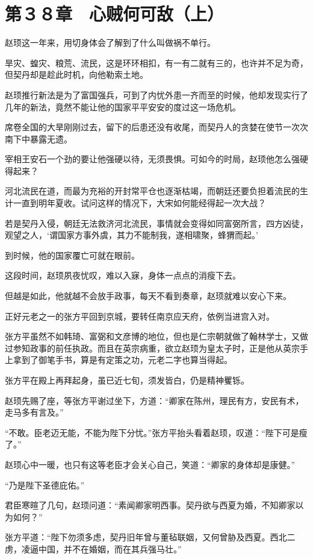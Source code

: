 \section{第３８章　心贼何可敌（上）}

赵顼这一年来，用切身体会了解到了什么叫做祸不单行。

旱灾、蝗灾、粮荒、流民，这是环环相扣，有一有二就有三的，也许并不足为奇，但契丹却是趁此时机，向他勒索土地。

赵顼推行新法是为了富国强兵，可到了内忧外患一齐而至的时候，他却发现实行了几年的新法，竟然不能让他的国家平平安安的度过这一场危机。

席卷全国的大旱刚刚过去，留下的后患还没有收尾，而契丹人的贪婪在使节一次次南下中暴露无遗。

宰相王安石一个劲的要让他强硬以待，无须畏惧。可如今的时局，赵顼他怎么强硬得起来？

河北流民在道，而最为充裕的开封常平仓也逐渐枯竭，而朝廷还要负担着流民的生计一直到明年夏收。试问这样的情况下，大宋如何能经得起一次大战？

若是契丹入侵，朝廷无法救济河北流民，事情就会变得如同富弼所言，四方凶徒，观望之人，‘谓国家方事外虞，其力不能制我，遂相啸聚，蜂猬而起。’

到时候，他的国家覆亡可就在眼前。

这段时间，赵顼夙夜忧叹，难以入寐，身体一点点的消瘦下去。

但越是如此，他就越不会放手政事，每天不看到奏章，赵顼就难以安心下来。

正好元老之一的张方平回到京城，要转任南京应天府，依例当进宫入对。

张方平虽然不如韩琦、富弼和文彦博的地位，但也是仁宗朝就做了翰林学士，又做过参知政事的前任执政。而且在英宗病重，欲立赵顼为皇太子时，正是他从英宗手上拿到了御笔手书，算是有定策之功，元老二字也算当得起。

张方平在殿上再拜起身，虽已近七旬，须发皆白，仍是精神矍铄。

赵顼先赐了座，等张方平谢过坐下，方道：“卿家在陈州，理民有方，安民有术，走马多有言及。”

“不敢。臣老迈无能，不能为陛下分忧。”张方平抬头看着赵顼，叹道：“陛下可是瘦了。”

赵顼心中一暖，也只有这等老臣才会关心自己，笑道：“卿家的身体却是康健。”

“乃是陛下圣德庇佑。”

君臣寒暄了几句，赵顼问道：“素闻卿家明西事。契丹欲与西夏为婚，不知卿家以为如何？”

张方平道：“陛下勿须多虑，契丹旧年曾与董毡联姻，又何曾胁及西夏。西北二虏，凌逼中国，并不在婚姻，而在其兵强马壮。”

